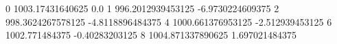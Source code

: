 0 1003.17431640625 0.0
1 996.2012939453125 -6.9730224609375
2 998.3624267578125 -4.8118896484375
4 1000.661376953125 -2.512939453125
6 1002.771484375 -0.40283203125
8 1004.871337890625 1.697021484375
